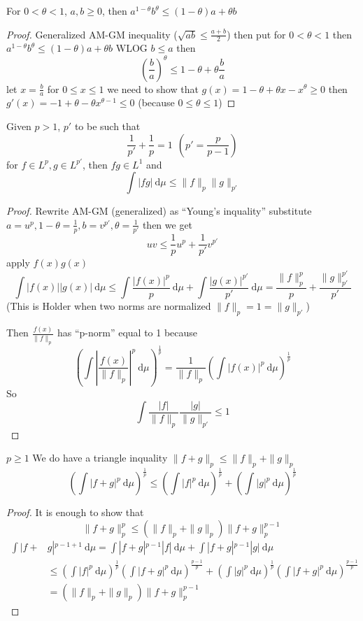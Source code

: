 \begin{claim}
  For $0 < \theta < 1$, $a, b \ge 0$, then $a^{1-\theta}b^\theta \le (1-\theta)a + \theta b$
\end{claim}

\begin{proof}
  Generalized AM-GM inequality ($\sqrt{ab}\le \frac{a+b}{2}$)
  then put for $0 < \theta < 1$ then $a^{1 -\theta}b^\theta \le (1-\theta)a + \theta b$ 
  WLOG $b \le a$ then \[\left(\frac ba\right)^\theta \le 1 - \theta + \theta\frac ba\]
  let $x = \frac ba$ for $0 \le x \le 1$ we need to show that $g(x) = 1- \theta + \theta x - x^\theta \ge 0$
  then $g'(x) = -1 + \theta -\theta x^{\theta - 1} \le 0$ (because $0 \le \theta \le 1$)
\end{proof}

\begin{claim}
  Given $p > 1$, $p'$ to be such that 
  \[\frac1{p'}+\frac1p = 1\ \ \left(p' = \frac p{p-1}\right)\]
  for $f \in L^p, g \in L^{p'}$, then $fg \in L^1$ and
  \[\int |fg| \ \mathrm{d}\mu \le \|f\|_p\|g\|_{p'}\]
\end{claim}

\begin{proof}
  Rewrite AM-GM (generalized) as ``Young's inquality'' substitute $a = u^p, 1-\theta = \frac1p, b = v^{p'}, \theta = \frac1{p'}$
  then we get 
  \[uv \le \frac1pu^p + \frac1{p'}v^{p'}\]
  apply $f(x)g(x)$
  \[\int |f(x)||g(x)|\ \mathrm{d}\mu \le \int \frac{|f(x)|^p}{p} \ \mathrm{d}\mu + \int \frac{|g(x)|^{p'}}{p'}\ \mathrm{d}\mu = \frac{\|f\|_p^p}{p} + \frac{\|g\|_{p'}^{p'}}{p'}\]
  (This is Holder when two norms are normalized $\|f\|_p = 1 = \|g\|_{p'}$)

  Then $\frac{f(x)}{\|f\|_p}$ has ``p-norm'' equal to 1 because
  \[\left(\int \left|\frac{f(x)}{\|f\|_p}\right|^p \ \mathrm{d}\mu\right)^{\frac1p} = \frac{1}{\|f\|_p}\left(\int |f(x)|^p \ \mathrm{d}\mu\right)^{\frac1p}\]
  So
  \[\int \frac{|f|}{\|f\|_p}\frac{|g|}{\|g\|_{p'}}  \le 1\]
\end{proof}
  
\begin{theorem}
  $p \ge 1$
  We do have a triangle inquality $\|f + g\|_p \le \|f\|_p + \|g\|_p$
  \[\left(\int |f+g|^p\ \mathrm{d}\mu \right)^{\frac1p} \le \left(\int |f|^p\ \mathrm{d}\mu\right)^{\frac1p} + \left(\int |g|^p \ \mathrm{d}\mu\right)^{\frac1p}\]
\end{theorem}

\begin{proof}
  It is enough to show that
  \[\|f+g\|_p^p \le (\|f\|_p + \|g\|_p)\|f+g\|_p^{p-1}\]
  \begin{align*}
    \int |f+&g|^{p-1+1} \ \mathrm{d}\mu = \int |f + g|^{p-1}|f|\ \mathrm{d}\mu + \int |f+g|^{p-1}|g|\ \mathrm{d}\mu \\
    &\le \left(\int |f|^{p}\ \mathrm{d}\mu\right)^{\frac{1}{p}}\left(\int |f+g|^p\ \mathrm{d}\mu\right)^{\frac{p-1}p} + \left(\int |g|^{p}\ \mathrm{d}\mu\right)^{\frac{1}{p}}\left(\int |f+g|^p\ \mathrm{d}\mu\right)^{\frac{p-1}p} \\
    &= (\|f\|_p + \|g\|_p)\|f+g\|_p^{p-1}
  \end{align*}
\end{proof}

